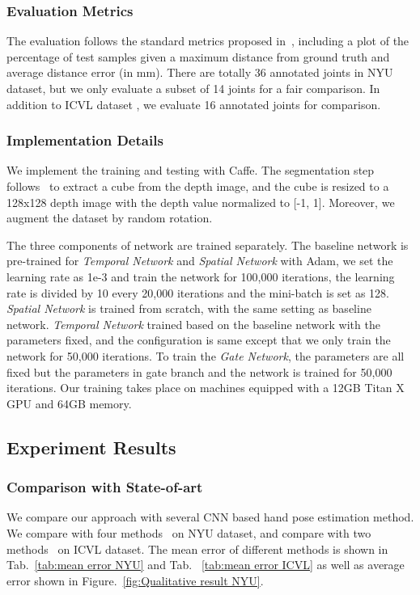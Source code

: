 \documentclass[journal,comsoc]{IEEEtran}
\begin{document}
\subsubsection{Evaluation Metrics}\label{sec:evaluation metrics}
The evaluation follows the standard metrics proposed in~\cite{tompson2014real}, including a
plot of the percentage of test samples given a maximum distance from ground truth and average
distance error (in mm). There are totally 36 annotated joints in NYU dataset, but we only
evaluate a subset of 14 joints for a fair comparison. In addition to ICVL dataset
, we evaluate 16 annotated joints for comparison.

\subsubsection{Implementation Details}\label{sec:implementation}
We implement the training and testing with Caffe\cite{jia2014caffe}. The segmentation step
follows~\cite{oberweger2015hands} to extract a cube from the depth image, and the cube is
resized to a 128x128 depth image with the depth value normalized to [-1, 1]. Moreover, we
augment the dataset by random rotation.

The three components of network are trained separately. The baseline network is pre-trained for
\emph{Temporal Network} and \emph{Spatial Network} with Adam, we set the learning rate as 1e-3
and train the network for 100,000 iterations, the learning rate is divided by 10 every 20,000
iterations and the mini-batch is set as 128. \emph{Spatial Network} is trained from scratch,
with the same setting as baseline network. \emph{Temporal Network} trained based on the baseline
network with the parameters fixed, and the configuration is same except that we only train the
network for 50,000 iterations.  To train the \emph{Gate Network}, the parameters are all fixed
but the parameters in gate branch and the network is trained for 50,000 iterations. Our training
takes place on machines equipped with a 12GB Titan X GPU and 64GB memory.

\subsection{Experiment Results}\label{sec:experiment results}
\subsubsection{Comparison with State-of-art}\label{sec:comparison}
We compare our approach with several CNN based hand pose estimation method. We compare with
four methods~\cite{tompson2014real, oberweger2015hands, oberweger2015training, zhou2016model}
on NYU dataset, and compare with two methods~\cite{oberweger2015hands, zhou2016model} on ICVL
dataset. The mean error of different methods is shown in Tab.~\ref{tab:mean error NYU} and Tab.
~\ref{tab:mean error ICVL} as well as average error shown in Figure.~\ref{fig:Qualitative result NYU}.
\end{document}
